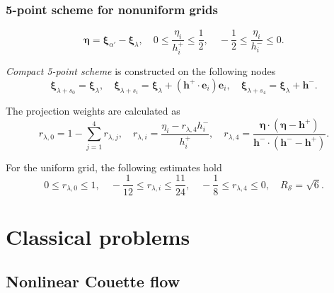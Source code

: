 \documentclass[mathserif]{beamer} %
\newcommand{\bxi}{\boldsymbol{\xi}}
\newcommand{\bh}{\boldsymbol{h}}
\newcommand{\be}{\boldsymbol{e}}
\begin{document}
\begin{frame}
    \frametitle{5-point scheme for nonuniform grids}
    \begin{equation}\label{eq:eta_definition}
        \boldsymbol{\eta} = \bxi_{\alpha'} - \bxi_{\lambda}, \quad
        0 \leq \frac{\eta_i}{h^+_i} \leq \frac12, \quad
        -\frac12 \leq \frac{\eta_i}{h^-_i} \leq 0.
    \end{equation}

    \emph{Compact 5-point scheme} is constructed on the following nodes
    \begin{equation}\label{eq:stencil_nodes_5}
        \bxi_{\lambda+s_0} = \bxi_{\lambda}, \quad
        \bxi_{\lambda+s_i} = \bxi_{\lambda} + (\bh^+\cdot \be_i)\be_i, \quad
        \bxi_{\lambda+s_4} = \bxi_{\lambda} + \bh^-.
    \end{equation}

    The projection weights are calculated as
    \begin{equation}\label{eq:stencil_weights_5}
        r_{\lambda,0} = 1 - \sum_{j=1}^4 r_{\lambda,j}, \quad
        r_{\lambda,i} = \frac{\eta_i - r_{\lambda,4}h^-_i}{h^+_i}, \quad
        r_{\lambda,4} = \frac{\boldsymbol{\eta}\cdot(\boldsymbol{\eta} - \bh^+)}
            {\bh^-\cdot(\bh^- - \bh^+)}.
    \end{equation}
    \vspace{-20pt}

    For the uniform grid, the following estimates hold
    \begin{equation}\label{eq:weights_ranges_5}
        0 \leq r_{\lambda,0} \leq 1, \quad
        -\frac1{12} \leq r_{\lambda,i} \leq \frac{11}{24}, \quad
        -\frac18 \leq r_{\lambda,4} \leq 0, \quad
        R_\mathcal{S} = \sqrt{6}.
    \end{equation}
\end{frame}

\section{Classical problems}

\subsection{Nonlinear Couette flow}
\end{document}
